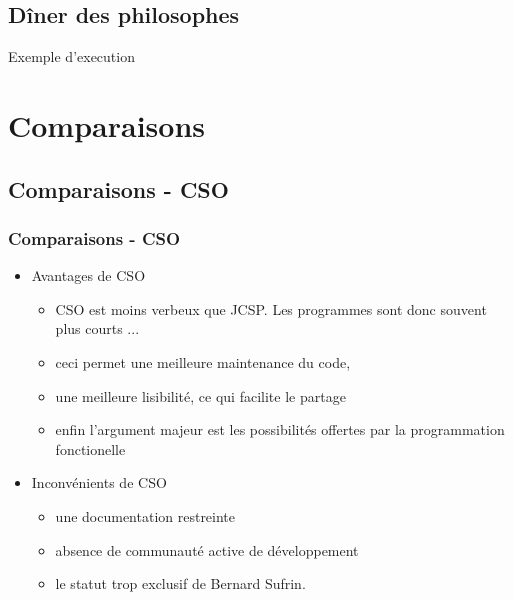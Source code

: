 \documentclass[slidetop,11pt]{beamer}
\begin{document}
\subsection{D\^iner des philosophes}
\begin{frame}
Exemple d'execution
\end{frame}

\section{Comparaisons}
\subsection{Comparaisons - CSO}
\begin{frame}
\frametitle{Comparaisons - CSO}
\begin{itemize}[<+->]
\item Avantages de CSO
\begin{itemize}[<+->]
\item CSO est moins verbeux que JCSP. Les programmes sont donc souvent plus courts ...
\item ceci permet une meilleure maintenance du code,
\item une meilleure lisibilité, ce qui facilite le partage
\item enfin l'argument majeur est les possibilités offertes par la programmation fonctionelle
\end{itemize}
\item Inconvénients de CSO
\begin{itemize}[<+->]
\item une documentation restreinte
\item absence de communauté active de développement
\item le statut trop exclusif de Bernard Sufrin.
\end{itemize}
\end{itemize}
\end{frame}
\end{document}
